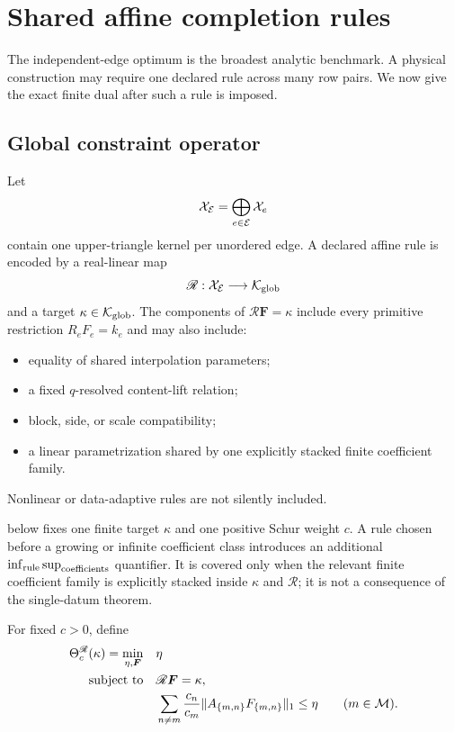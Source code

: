 \section{Shared affine completion rules}
\label{sec:coupled-rules}

The independent-edge optimum is the broadest analytic benchmark.  A
physical construction may require one declared rule across many row
pairs.  We now give the exact finite dual after such a rule is imposed.

\subsection{Global constraint operator}

Let
\[
 \mathcal X_{\mathcal E}=\bigoplus_{e\in\mathcal E}\mathcal X_e
\]
contain one upper-triangle kernel per unordered edge.  A declared affine
rule is encoded by a real-linear map
\[
 \mathscr R:\mathcal X_{\mathcal E}\longrightarrow\mathcal K_{\rm glob}
\]
and a target \(\kappa\in\mathcal K_{\rm glob}\).  The components of
\(\mathscr R\boldsymbol F=\kappa\) include every primitive restriction
\(R_eF_e=k_e\) and may also include:
\begin{itemize}
 \item equality of shared interpolation parameters;
 \item a fixed \(q\)-resolved content-lift relation;
 \item block, side, or scale compatibility;
 \item a linear parametrization shared by one explicitly stacked finite
       coefficient family.
\end{itemize}
Nonlinear or data-adaptive rules are not silently included.

\begin{remark}
\label{rem:fixed-data-coupling}
 below fixes one finite target
\(\kappa\) and one positive Schur weight \(c\).  A rule chosen before a
growing or infinite coefficient class introduces an additional
\(\inf_{\rm rule}\sup_{\rm coefficients}\) quantifier.  It is covered
only when the relevant finite coefficient family is explicitly stacked
inside \(\kappa\) and \(\mathscr R\); it is not a consequence of the
single-datum theorem.
\end{remark}

For fixed \(c>0\), define
\begin{align}
 \Theta_c^{\mathscr R}(\kappa)
 =
 \min_{\eta,\boldsymbol F}\quad&\eta
 \label{eq:coupled-primal}\\
 \textup{subject to}\quad&
 \mathscr R\boldsymbol F=\kappa,\notag\\
 &
 \sum_{n\ne m}\frac{c_n}{c_m}
 \|A_{\{m,n\}}F_{\{m,n\}}\|_1
 \le\eta
 \qquad(m\in\mathcal M).\notag
\end{align}

